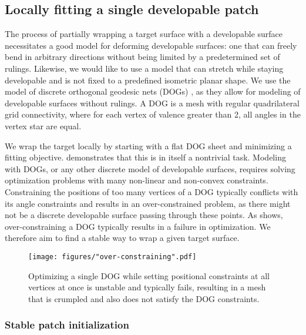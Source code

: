 \subsection{Locally fitting a single developable patch} 
\label{sec:wrap_single_dev}

The process of partially wrapping a target surface with a developable surface necessitates a good model for deforming developable surfaces: one that can freely bend in arbitrary directions without being limited by a predetermined set of rulings. Likewise, we would like to use a model that can stretch while staying developable and is not fixed to a predefined isometric planar shape. We use the model of discrete orthogonal geodesic nets (DOGs)  \cite{Rabinovich:DogNets:2018}, as they allow for modeling of developable surfaces without rulings. A DOG is a mesh with regular quadrilateral grid connectivity, where for each vertex of valence greater than 2, all angles in the vertex star are equal.

We wrap the target locally by starting with a flat DOG sheet and minimizing a fitting objective.  demonstrates that this is in itself a nontrivial task. Modeling with DOGs, or any other discrete model of developable surfaces, requires solving optimization problems with many non-linear and non-convex constraints. Constraining the positions of too many vertices of a DOG typically conflicts with its angle constraints and  results in an over-constrained problem, as there might not be a discrete developable surface passing through these points. As  shows, over-constraining a DOG typically results in a failure in optimization. We therefore aim to find a stable way to wrap a given target surface.

\begin{figure}[h!]
\centering
\texttt{[image: figures/"over-constraining".pdf]}
\caption{
	Optimizing a single DOG while setting positional constraints at all vertices at once is unstable and typically fails, resulting in a mesh that is crumpled and also does not satisfy the DOG constraints. 
\label{fig:single_patch_unstable}}
\end{figure}


\subsubsection{Stable patch initialization} \label{sec:patch_initialization}

